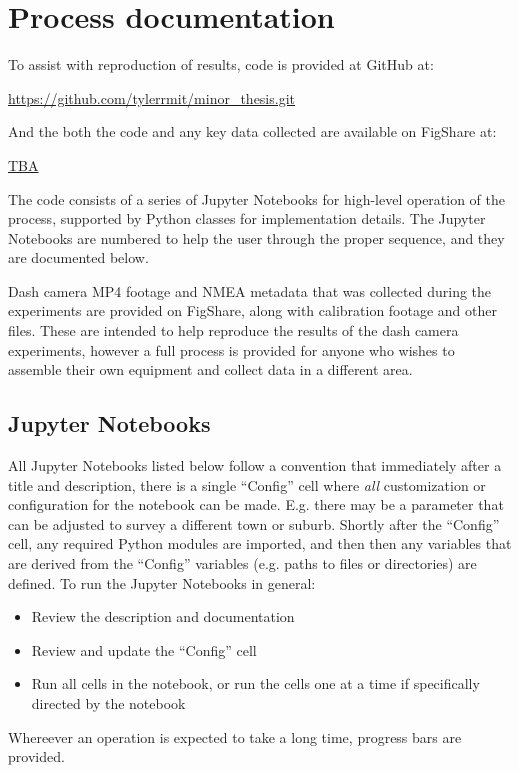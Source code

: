 \documentclass[11pt,twoside]{report}
\begin{document}
\chapter{Process documentation}
\label{a:process}

To assist with reproduction of results, code is provided at GitHub at:

\url{https://github.com/tylerrmit/minor_thesis.git}

And the both the code and any key data collected are available on FigShare at:

\url{TBA}

The code consists of a series of Jupyter Notebooks for high-level operation of the process, supported by Python classes for implementation details.  The Jupyter Notebooks are numbered to help the user through the proper sequence, and they are documented below.

Dash camera MP4 footage and NMEA metadata that was collected during the experiments are provided on FigShare, along with calibration footage and other files.  These are intended to help reproduce the results of the dash camera experiments, however a full process is provided for anyone who wishes to assemble their own equipment and collect data in a different area.

\section{Jupyter Notebooks}
\label{aj}

All Jupyter Notebooks listed below follow a convention that immediately after a title and description, there is a single ``Config'' cell where \textit{all} customization or configuration for the notebook can be made.  E.g. there may be a parameter that can be adjusted to survey a different town or suburb.  Shortly after the ``Config'' cell, any required Python modules are imported, and then then any variables that are derived from the ``Config'' variables (e.g. paths to files or directories) are defined.  To run the Jupyter Notebooks in general:

\begin{itemize}
\item{Review the description and documentation}
\item{Review and update the ``Config'' cell}
\item{Run all cells in the notebook, or run the cells one at a time if specifically directed by the notebook}	
\end{itemize}
Whereever an operation is expected to take a long time, progress bars are provided.
\end{document}
